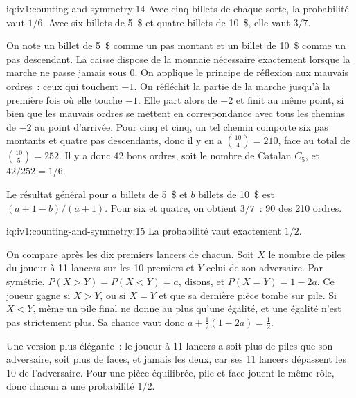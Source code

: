 \begin{solution}{iq:iv1:counting-and-symmetry:14}
Avec cinq billets de chaque sorte, la probabilité vaut $1/6$. Avec six billets de 5~\$ et quatre billets de 10~\$, elle vaut $3/7$.

On note un billet de 5~\$ comme un pas montant et un billet de 10~\$ comme un pas descendant. La caisse dispose de la monnaie nécessaire exactement lorsque la marche ne passe jamais sous 0. On applique le principe de réflexion aux mauvais ordres~: ceux qui touchent $-1$. On réfléchit la partie de la marche jusqu'à la première fois où elle touche $-1$. Elle part alors de $-2$ et finit au même point, si bien que les mauvais ordres se mettent en correspondance avec tous les chemins de $-2$ au point d'arrivée. Pour cinq et cinq, un tel chemin comporte six pas montants et quatre pas descendants, donc il y en a $\binom{10}{4} = 210$, face au total de $\binom{10}{5} = 252$. Il y a donc 42 bons ordres, soit le nombre de Catalan $C_5$, et $42/252 = 1/6$.

Le résultat général pour $a$ billets de 5~\$ et $b$ billets de 10~\$ est $(a + 1 - b)/(a + 1)$. Pour six et quatre, on obtient $3/7$~: $90$ des 210 ordres.

\end{solution}

\begin{solution}{iq:iv1:counting-and-symmetry:15}
La probabilité vaut exactement $1/2$.

On compare après les dix premiers lancers de chacun. Soit $X$ le nombre de piles du joueur à 11 lancers sur les 10 premiers et $Y$ celui de son adversaire. Par symétrie, $P(X > Y) = P(X < Y) = a$, disons, et $P(X = Y) = 1 - 2a$. Ce joueur gagne si $X > Y$, ou si $X = Y$ et que sa dernière pièce tombe sur pile. Si $X < Y$, même un pile final ne donne au plus qu'une égalité, et une égalité n'est pas strictement plus. Sa chance vaut donc $a + \tfrac12(1 - 2a) = \tfrac12$.

Une version plus élégante~: le joueur à 11 lancers a soit plus de piles que son adversaire, soit plus de faces, et jamais les deux, car ses 11 lancers dépassent les 10 de l'adversaire. Pour une pièce équilibrée, pile et face jouent le même rôle, donc chacun a une probabilité $1/2$.

\end{solution}

